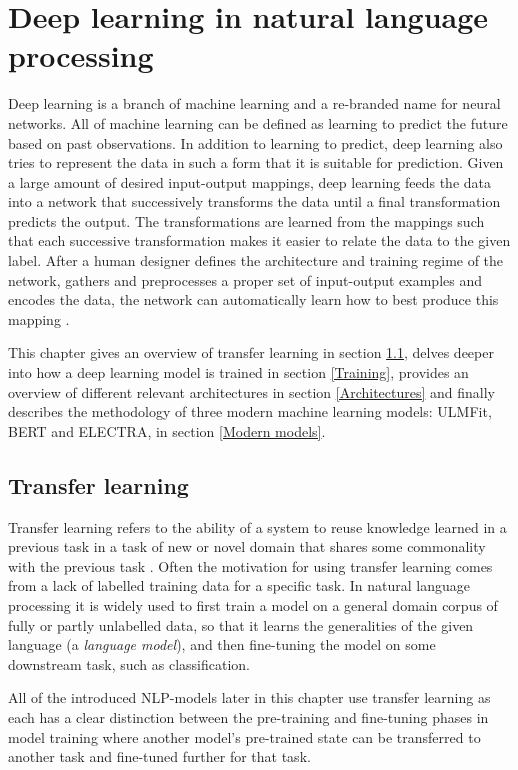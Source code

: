 \chapter{Deep learning in natural language processing} \label{Deep learning in natural language processing}
Deep learning is a branch of machine learning and a re-branded name for neural networks.
All of machine learning can be defined as learning to predict the future based on past observations.
In addition to learning to predict, deep learning also tries to represent the data in such a form that it is suitable for prediction.
Given a large amount of desired input-output mappings, deep learning feeds the data into a network that successively transforms the data until a final transformation predicts the output.
The transformations are learned from the mappings such that each successive transformation makes it easier to relate the data to the given label.
After a human designer defines the architecture and training regime of the network, gathers and preprocesses a proper set of input-output examples and encodes the data, the network can automatically learn how to best produce this mapping \cite{goldberg2017}.

This chapter gives an overview of transfer learning in section \ref{Transfer learning}, delves deeper into how a deep learning model is trained in section \ref{Training}, provides an overview of different relevant architectures in section \ref{Architectures} and finally describes the methodology of three modern machine learning models: ULMFit, BERT and ELECTRA, in section \ref{Modern models}.

\section{Transfer learning} \label{Transfer learning}
Transfer learning refers to the ability of a system to reuse knowledge learned in a previous task in a task of new or novel domain that shares some commonality with the previous task \cite{yang2020}.
Often the motivation for using transfer learning comes from a lack of labelled training data for a specific task.
In natural language processing it is widely used to first train a model on a general domain corpus of fully or partly unlabelled data, so that it learns the generalities of the given language (a \textit{language model}), and then fine-tuning the model on some downstream task, such as classification.

All of the introduced NLP-models later in this chapter use transfer learning as each has a clear distinction between the pre-training and fine-tuning phases in model training where another model's pre-trained state can be transferred to another task and fine-tuned further for that task.

